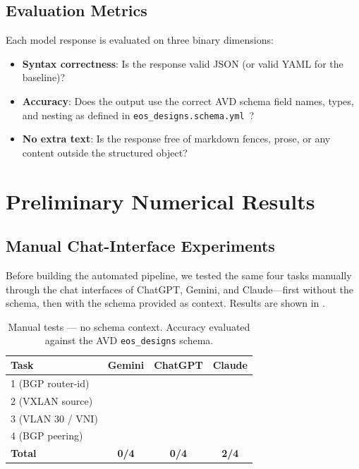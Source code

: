 \documentclass[11pt, letterpaper]{article}
\newcommand{\cmark}{\ding{51}}  %
\newcommand{\xmark}{\ding{55}}  %
\begin{document}
\subsection{Evaluation Metrics}
\label{sec:metrics}

Each model response is evaluated on three binary dimensions:

\begin{itemize}[leftmargin=*]
    \item \textbf{Syntax correctness}: Is the response valid JSON (or valid YAML for the baseline)?
    \item \textbf{Accuracy}: Does the output use the correct AVD schema field names, types, and nesting as defined in \texttt{eos\_designs.schema.yml}~\cite{avd_docs}?
    \item \textbf{No extra text}: Is the response free of markdown fences, prose, or any content outside the structured object?
\end{itemize}

\section{Preliminary Numerical Results}
\label{sec:results}

\subsection{Manual Chat-Interface Experiments}
\label{sec:manual}

Before building the automated pipeline, we tested the same four tasks manually through the chat interfaces of ChatGPT, Gemini, and Claude---first without the schema, then with the schema provided as context. Results are shown in .

\begin{table}[H]
\centering
\caption{Manual tests --- no schema context. Accuracy evaluated against the AVD \texttt{eos\_designs} schema.}
\label{tab:manual_no_schema}
\begin{tabular}{lccc}
\toprule
\textbf{Task} & \textbf{Gemini} & \textbf{ChatGPT} & \textbf{Claude} \\
\midrule
1 (BGP router-id) & \xmark & \xmark & \xmark \\
2 (VXLAN source)   & \xmark & \xmark & \cmark \\
3 (VLAN 30 / VNI)  & \xmark & \xmark & \cmark \\
4 (BGP peering)    & \xmark & \xmark & \xmark \\
\midrule
\textbf{Total} & \textbf{0/4} & \textbf{0/4} & \textbf{2/4} \\
\bottomrule
\end{tabular}
\end{table}
\end{document}
